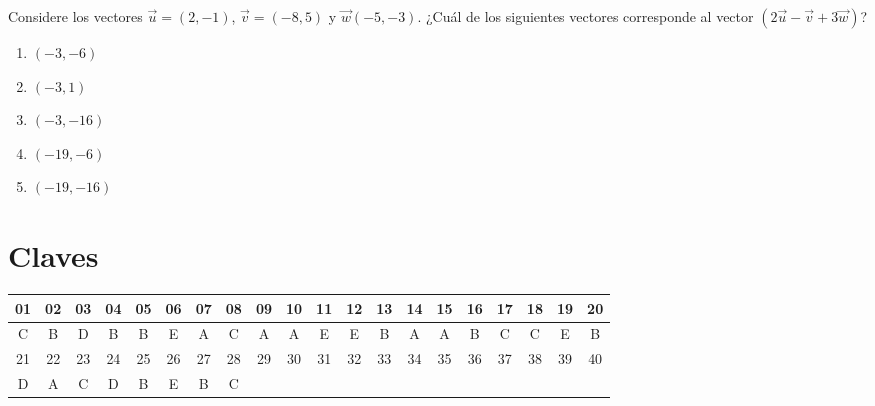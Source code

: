 \begin{enumerate}[label=\large{\textbf{\arabic*.}}, itemsep = 0.15cm, topsep = 0.5cm]
	
	
	\parbox{1\linewidth}{ \item Considere los vectores $\vec{u}=(2,-1)$, $\vec{v}=(-8,5)$ y $\vec{w}(-5,-3)$. ¿Cuál de los siguientes vectores corresponde al vector $(2\vec{u}-\vec{v}+3\vec{w})$?
		\begin{enumerate}[label={\Alph*)}, itemsep = 0.15cm, topsep = 0.5cm]
			\item $(-3,-6)$
			\item $(-3,1)$
			\item $(-3, -16)$
			\item $(-19,-6)$
			\item $(-19,-16)$
	\end{enumerate}}
	
	
\end{enumerate}

\section{Claves}

\begin{tabular}{|c|c|c|c|c|c|c|c|c|c|c|c|c|c|c|c|c|c|c|c|} %
	\hline
	\cellcolor{calipso2!90}01 & 	\cellcolor{calipso2!90}02 & 	\cellcolor{calipso2!90}03&	\cellcolor{calipso2!90}04&	\cellcolor{calipso2!90}05&	\cellcolor{calipso2!90}06&	\cellcolor{calipso2!90}07&	\cellcolor{calipso2!90}08&	\cellcolor{calipso2!90}09&	\cellcolor{calipso2!90}10 &	\cellcolor{calipso2!90}11 &	\cellcolor{calipso2!90}12 &	\cellcolor{calipso2!90}13&	\cellcolor{calipso2!90}14&	\cellcolor{calipso2!90}15&	\cellcolor{calipso2!90}16&	\cellcolor{calipso2!90}17&	\cellcolor{calipso2!90}18&	\cellcolor{calipso2!90}19&	\cellcolor{calipso2!90}20\\ \hline %
	C&B&D&B&B&E&A&C&A&A&E&E&B&A&A&B&C&C&E &B\\ \hline
	\cellcolor{calipso2!90}21 & 	\cellcolor{calipso2!90}22 & 	\cellcolor{calipso2!90}23&	\cellcolor{calipso2!90}24&	\cellcolor{calipso2!90}25&	\cellcolor{calipso2!90}26&	\cellcolor{calipso2!90}27&	\cellcolor{calipso2!90}28&	\cellcolor{calipso2!90}29&	\cellcolor{calipso2!90}30 &	\cellcolor{calipso2!90}31 &	\cellcolor{calipso2!90}32 &	\cellcolor{calipso2!90}33&	\cellcolor{calipso2!90}34&	\cellcolor{calipso2!90}35&	\cellcolor{calipso2!90}36&	\cellcolor{calipso2!90}37&	\cellcolor{calipso2!90}38&	\cellcolor{calipso2!90}39&	\cellcolor{calipso2!90}40\\ \hline %
	D&A&C&D&B&E&B&C&&&&&&&&&&& &\\ \hline
	
\end{tabular}